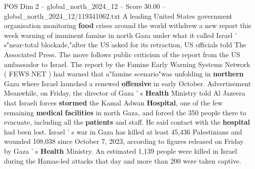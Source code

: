 \begin{textsample}{POS Dim 2 – global\_north\_2024\_12 – Score 30.00 – global\_north\_2024\_12/119341062.txt}
A leading United States government organisation monitoring \textbf{food} crises around the world withdrew a new report this week warning of imminent famine in north Gaza under what it called Israel ' s"near-total blockade,"after the US asked for its retraction, US officials told The Associated Press.
The move follows public criticism of the report from the US ambassador to Israel.
The report by the Famine Early Warning Systems Network ( FEWS NET ) had warned that a"famine scenario"was unfolding in \textbf{northern} Gaza where Israel launched a renewed \textbf{offensive} in early October.
Advertisement Meanwhile, on Friday, the director of Gaza ' s \textbf{Health} Ministry told Al Jazeera that Israeli forces \textbf{stormed} the Kamal Adwan \textbf{Hospital}, one of the few remaining \textbf{medical} \textbf{facilities} in north Gaza, and forced the 350 people there to evacuate, including all the \textbf{patients} and staff.
He said contact with the \textbf{hospital} had been lost.
Israel ' s war in Gaza has killed at least 45,436 Palestinians and wounded 108,038 since October 7, 2023, according to figures released on Friday by Gaza ' s \textbf{Health} Ministry.
An estimated 1,139 people were killed in Israel during the Hamas-led attacks that day and more than 200 were taken captive.

\end{textsample}
